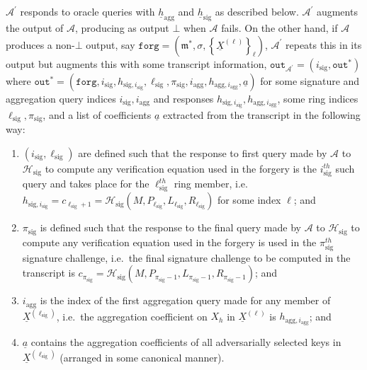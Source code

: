 \documentclass{iacrtrans}
\theoremstyle{definition}
\numberwithin{theorem}{subsection}
\numberwithin{lemma}{theorem}
\newcommand{\adversary}{\mathcal{A}}
\newcommand{\m}{\mathfrak{m}}
\begin{document}
$\adversary^\prime$ responds to oracle queries with $\underline{h}_{\text{agg}}$ and $\underline{h}_{\text{sig}}$ as described below. $\adversary^\prime$ augments the output of $\adversary$, producing as output $\bot$ when $\adversary$ fails. On the other hand, if $\adversary$ produces a non-$\bot$ output, say $\texttt{forg} = \left(\m^*, \sigma, \left\{\underline{X}^{(\ell)}\right\}_\ell\right)$, $\adversary^\prime$ repeats this in its output but augments this with some transcript information, $\texttt{out}_{\adversary^\prime} = (i_{\text{sig}}, \texttt{out}^*)$ where $\texttt{out}^* = (\texttt{forg}, i_{\text{sig}}, h_{\text{sig}, i_{\text{sig}}}, \ell_{\text{sig}}, \pi_{\text{sig}}, i_{\text{agg}}, h_{\text{agg}, i_{\text{agg}}}, \underline{a})$ for some signature and aggregation query indices $i_{\text{sig}}, i_{\text{agg}}$ and responses $h_{\text{sig}, i_{\text{sig}}}, h_{\text{agg}, i_{\text{agg}}}$, some ring indices $\ell_{\text{sig}}, \pi_{\text{sig}}$, and a list of coefficients $\underline{a}$ extracted from the transcript in the following way:
\begin{enumerate}
\item $(i_{\text{sig}}, \ell_{\text{sig}})$ are defined such that the response to first query made by $\adversary$ to $\mathcal{H}_{\text{sig}}$ to compute any verification equation used in the forgery is the $i_{\text{sig}}^{th}$ such query and takes place for the $\ell_{\text{sig}}^{th}$ ring member, i.e.\ $h_{\text{sig}, i_{\text{sig}}} = c_{\ell_{\text{sig}}+1} = \mathcal{H}_{\text{sig}}(M, P_{\ell_{\text{sig}}}, L_{\ell_{\text{sig}}}, R_{\ell_{\text{sig}}})$ for some index $\ell$; and

\item $\pi_{\text{sig}}$ is defined such that the response to the final query made by $\adversary$ to $\mathcal{H}_{\text{sig}}$ to compute any verification equation used in the forgery is used in the $\pi_{\text{sig}}^{th}$ signature challenge, i.e.\ the final signature challenge to be computed in the transcript is $c_{\pi_{\text{sig}}} = \mathcal{H}_{\text{sig}}(M, P_{\pi_{\text{sig}}-1},  L_{\pi_{\text{sig}}-1}, R_{\pi_{\text{sig}}-1})$; and

\item $i_{\text{agg}}$ is the index of the first aggregation query made for any member of $\underline{X}^{(\ell_{\text{sig}})}$, i.e.\ the aggregation coefficient on $X_h$ in $\underline{X}^{(\ell)}$ is $h_{\text{agg},i_{\text{agg}}}$; and

\item $\underline{a}$ contains the aggregation coefficients of all adversarially selected keys in $\underline{X}^{(\ell_{\text{sig}})}$ (arranged in some canonical manner).


\end{enumerate}
\end{document}
